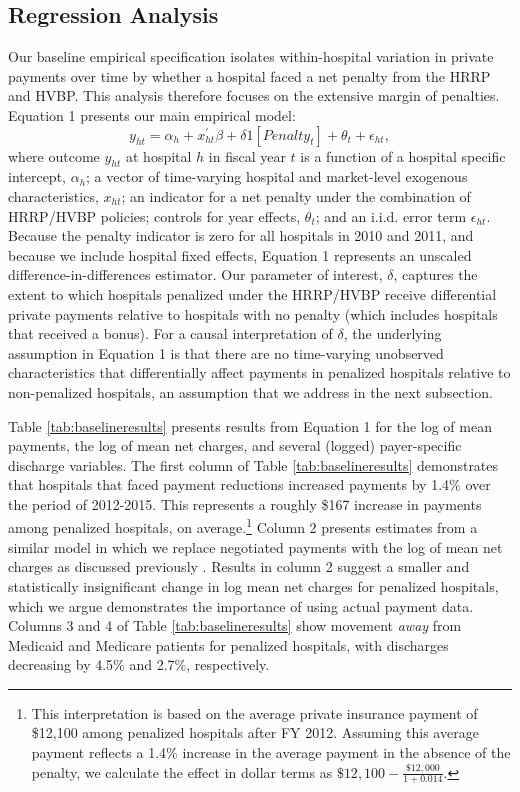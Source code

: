 \documentclass[12pt]{article}
\begin{document}
\subsection{Regression Analysis}
Our baseline empirical specification isolates within-hospital variation in private payments over time by whether a hospital faced a net penalty from the HRRP and HVBP. This analysis therefore focuses on the extensive margin of penalties.  Equation 1 presents our main empirical model:
\begin{equation}
\label{eq: reg}
y_{ht} = \alpha_{h} + x^{'}_{ht}\beta + \delta1[Penalty_{t}]  + \theta_{t}  +  \epsilon_{ht},
\end{equation}
where outcome $y_{ht}$ at hospital $h$ in fiscal year $t$ is a function of a hospital specific intercept, $\alpha_{h}$; a vector of time-varying hospital and market-level exogenous characteristics, $x_{ht}$; an indicator for a net penalty under the combination of HRRP/HVBP policies; controls for year effects, $\theta_t$; and an i.i.d. error term $\epsilon_{ht}$.  Because the penalty indicator is zero for all hospitals in 2010 and 2011, and because we include hospital fixed effects, Equation 1 represents an unscaled difference-in-differences estimator. Our parameter of interest, $\delta$, captures the extent to which hospitals penalized under the HRRP/HVBP receive differential private payments relative to hospitals with no penalty (which includes hospitals that received a bonus).  For a causal interpretation of $\delta$, the underlying assumption in Equation 1 is that there are no time-varying unobserved characteristics that differentially affect payments in penalized hospitals relative to non-penalized hospitals, an assumption that we address in the next subsection.

Table \ref{tab:baselineresults} presents results from Equation 1 for the log of mean payments, the log of mean net charges, and several (logged) payer-specific discharge variables. The first column of Table \ref{tab:baselineresults} demonstrates that hospitals that faced payment reductions increased payments by 1.4\% over the period of 2012-2015.  This represents a roughly \$167 increase in payments among penalized hospitals, on average.\footnote{This interpretation is based on the average private insurance payment of \$12,100 among penalized hospitals after FY 2012. Assuming this average payment reflects a 1.4\% increase in the average payment in the absence of the penalty, we calculate the effect in dollar terms as $\$12,100 - \frac{\$12,000}{1+0.014}$.} Column 2 presents estimates from a similar model in which we replace negotiated payments with the log of mean net charges as discussed previously \citep{dafny2009,lewis2015,schmitt2017,dranove2017}. Results in column 2 suggest a smaller and statistically insignificant change in log mean net charges for penalized hospitals, which we argue demonstrates the importance of using actual payment data.  Columns 3 and 4 of Table \ref{tab:baselineresults} show movement \textit{away} from Medicaid and Medicare patients for penalized hospitals, with discharges decreasing by 4.5\% and 2.7\%, respectively.
\end{document}
